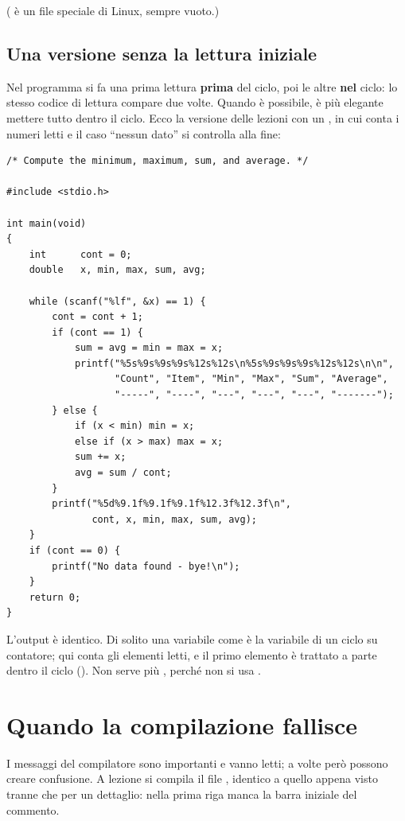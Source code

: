( è un file speciale di Linux, sempre vuoto.)

\subsection{Una versione senza la lettura iniziale}

Nel programma si fa una prima lettura \textbf{prima} del ciclo, poi le altre
\textbf{nel} ciclo: lo stesso codice di lettura compare due volte. Quando è
possibile, è più elegante mettere tutto dentro il ciclo. Ecco la versione
delle lezioni con un , in cui  conta i numeri letti e
il caso “nessun dato” si controlla alla fine:

\begin{lstlisting}[style=c, name=running_sum2.c]
/* Compute the minimum, maximum, sum, and average. */

#include <stdio.h>

int main(void)
{
    int      cont = 0;
    double   x, min, max, sum, avg;

    while (scanf("%lf", &x) == 1) {
        cont = cont + 1;
        if (cont == 1) {
            sum = avg = min = max = x;
            printf("%5s%9s%9s%9s%12s%12s\n%5s%9s%9s%9s%12s%12s\n\n",
                   "Count", "Item", "Min", "Max", "Sum", "Average",
                   "-----", "----", "---", "---", "---", "-------");
        } else {
            if (x < min) min = x;
            else if (x > max) max = x;
            sum += x;
            avg = sum / cont;
        }
        printf("%5d%9.1f%9.1f%9.1f%12.3f%12.3f\n",
               cont, x, min, max, sum, avg);
    }
    if (cont == 0) {
        printf("No data found - bye!\n");
    }
    return 0;
}
\end{lstlisting}

L'output è identico. Di solito una variabile come  è la variabile di
un ciclo su contatore; qui  conta gli elementi letti, e il primo
elemento è trattato a parte dentro il ciclo (). Non serve
più , perché non si usa .

\section{Quando la compilazione fallisce}

I messaggi del compilatore sono importanti e vanno letti; a volte però
possono creare confusione. A lezione si compila il file
, identico a quello appena visto tranne che per
un dettaglio: nella prima riga manca la barra iniziale del commento.


